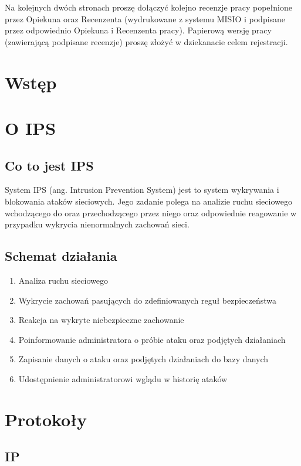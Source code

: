 \documentclass[a4paper,12pt,oneside]{book}
\begin{document}
\newpage
\linespread{1.3}
\selectfont

\noindent
Na kolejnych dwóch stronach proszę dołączyć kolejno recenzje pracy popełnione przez Opiekuna oraz Recenzenta (wydrukowane z systemu MISIO i podpisane przez odpowiednio Opiekuna i Recenzenta pracy). Papierową wersję pracy (zawierającą podpisane recenzje) proszę złożyć w dziekanacie celem rejestracji.

\vspace{85mm}
\tableofcontents
\chapter*{Wstęp}
\chapter{O IPS}
	\section{Co to jest IPS}
	System IPS (ang. Intrusion Prevention System) jest to system wykrywania i blokowania ataków sieciowych.
	Jego zadanie polega na analizie ruchu sieciowego wchodzącego do oraz przechodzącego przez niego oraz odpowiednie reagowanie w przypadku wykrycia nienormalnych zachowań sieci.
	\section{Schemat działania}
		\begin{enumerate}
			\item Analiza ruchu sieciowego
			\item Wykrycie zachowań pasujących do zdefiniowanych reguł bezpieczeństwa
			\item Reakcja na wykryte niebezpieczne zachowanie
			\item Poinformowanie administratora o próbie ataku oraz podjętych działaniach
			\item Zapisanie danych o ataku oraz podjętych działaniach do bazy danych
			\item Udostępnienie administratorowi wglądu w historię ataków
		\end{enumerate}
\chapter{Protokoły}
	\section{IP}
\end{document}

